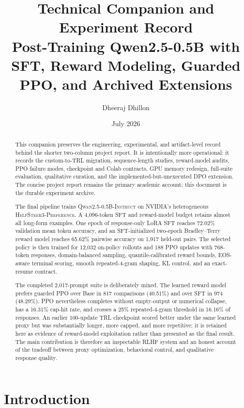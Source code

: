 \documentclass[11pt]{article}
\title{
  \vspace{-1.5cm}
  \textbf{Technical Companion and Experiment Record}\\
  \large Post-Training Qwen2.5-0.5B with SFT, Reward Modeling, Guarded PPO, and Archived Extensions
}
\author{Dheeraj Dhillon}
\date{July 2026}
\newcommand{\model}{\textsc{Qwen2.5-0.5B-Instruct}}
\newcommand{\dataset}{\textsc{HelpSteer3-Preference}}
\newcommand{\trl}{\textsc{TRL}}
\begin{document}
\maketitle

\begin{abstract}
This companion preserves the engineering, experimental, and artifact-level
record behind the shorter two-column project report. It is intentionally more
operational: it records the custom-to-\trl{} migration, sequence-length studies,
reward-model audits, PPO failure modes, checkpoint and Colab contracts, GPU
memory redesign, full-suite evaluation, qualitative curation, and the
implemented-but-unexecuted DPO extension. The concise project report remains
the primary academic account; this document is the durable experiment archive.

The final pipeline trains \model{} on NVIDIA's heterogeneous \dataset{}. A
4,096-token SFT and reward-model budget retains almost all long-form examples.
One epoch of response-only LoRA SFT reaches 72.02\% validation mean token
accuracy, and an SFT-initialized two-epoch Bradley--Terry reward model reaches
65.62\% pairwise accuracy on 1,917 held-out pairs. The selected policy is then
trained for 12,032 on-policy rollouts and 188 PPO updates with 768-token
responses, domain-balanced sampling, quantile-calibrated reward bounds,
EOS-aware terminal scoring, smooth repeated-4-gram shaping, KL control, and an
exact-resume contract.

The completed 2,017-prompt suite is deliberately mixed. The learned reward
model prefers guarded PPO over Base in 817 comparisons (40.51\%) and over SFT
in 974 (48.29\%). PPO nevertheless completes without empty-output or numerical
collapse, has a 16.31\% cap-hit rate, and crosses a 25\% repeated-4-gram
threshold in 16.16\% of responses. An earlier 100-update TRL checkpoint scored
better under the same learned proxy but was substantially longer, more capped,
and more repetitive; it is retained here as evidence of reward-model
exploitation rather than presented as the final result. The main contribution
is therefore an inspectable RLHF system and an honest account of the tradeoff
between proxy optimization, behavioral control, and qualitative response
quality.
\end{abstract}

\tableofcontents
\newpage

\section{Introduction}
\end{document}
